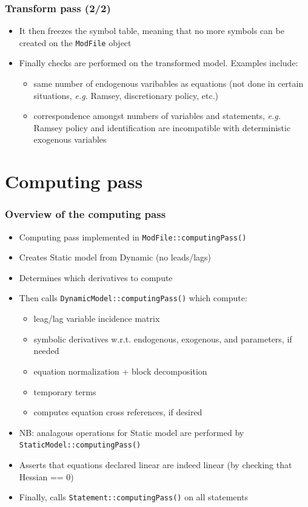 \documentclass{beamer}
\begin{document}
\begin{frame}
  \frametitle{Transform pass (2/2)}
  \begin{itemize}
  \item It then freezes the symbol table, meaning that no more symbols can be created on the \texttt{ModFile} object
  \item Finally checks are performed on the transformed model. Examples include:
    \begin{itemize}
    \item same number of endogenous varibables as equations (not done in certain situations, \textit{e.g.} Ramsey, discretionary policy, etc.)
    \item correspondence amongst numbers of variables and statements, \textit{e.g.} Ramsey policy and identification are incompatible with deterministic exogenous variables
    \end{itemize}
  \end{itemize}
\end{frame}


\section{Computing pass}

\begin{frame}
  \frametitle{Overview of the computing pass}
  \begin{itemize}
  \item Computing pass implemented in \texttt{ModFile::computingPass()}
  \item Creates Static model from Dynamic (no leads/lags)
  \item Determines which derivatives to compute
  \item Then calls \texttt{DynamicModel::computingPass()} which compute:
    \begin{itemize}
    \item leag/lag variable incidence matrix
    \item symbolic derivatives w.r.t. endogenous, exogenous, and parameters, if needed
    \item equation normalization + block decomposition
    \item temporary terms
    \item computes equation cross references, if desired
    \end{itemize}
  \item NB: analagous operations for Static model are performed by \texttt{StaticModel::computingPass()}
  \item Asserts that equations declared linear are indeed linear (by checking that Hessian == 0)
  \item Finally, calls \texttt{Statement::computingPass()} on all statements
  \end{itemize}
\end{frame}
\end{document}
